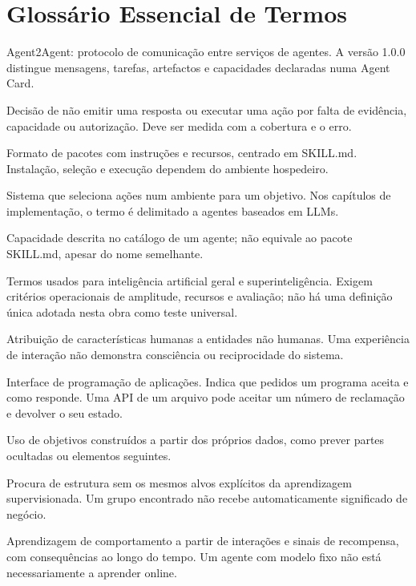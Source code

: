 \chapter{Glossário Essencial de Termos}
\label{ap:glossario}

\begin{description}[style=nextline,leftmargin=0pt,labelindent=0pt,labelsep=0pt,labelwidth=0pt]
\item[A2A] Agent2Agent: protocolo de comunicação entre serviços de agentes. A versão 1.0.0 distingue mensagens, tarefas, artefactos e capacidades declaradas numa Agent Card.
\item[Abstinência] Decisão de não emitir uma resposta ou executar uma ação por falta de evidência, capacidade ou autorização. Deve ser medida com a cobertura e o erro.
\item[Agent Skills] Formato de pacotes com instruções e recursos, centrado em SKILL.md. Instalação, seleção e execução dependem do ambiente hospedeiro.
\item[Agente] Sistema que seleciona ações num ambiente para um objetivo. Nos capítulos de implementação, o termo é delimitado a agentes baseados em LLMs.
\item[AgentSkill em A2A] Capacidade descrita no catálogo de um agente; não equivale ao pacote SKILL.md, apesar do nome semelhante.
\item[AGI e ASI] Termos usados para inteligência artificial geral e superinteligência. Exigem critérios operacionais de amplitude, recursos e avaliação; não há uma definição única adotada nesta obra como teste universal.
\item[Antropomorfização] Atribuição de características humanas a entidades não humanas. Uma experiência de interação não demonstra consciência ou reciprocidade do sistema.
\item[API] Interface de programação de aplicações. Indica que pedidos um programa aceita e como responde. Uma API de um arquivo pode aceitar um número de reclamação e devolver o seu estado.
\item[Aprendizagem autossupervisionada] Uso de objetivos construídos a partir dos próprios dados, como prever partes ocultadas ou elementos seguintes.
\item[Aprendizagem não supervisionada] Procura de estrutura sem os mesmos alvos explícitos da aprendizagem supervisionada. Um grupo encontrado não recebe automaticamente significado de negócio.
\item[Aprendizagem por reforço] Aprendizagem de comportamento a partir de interações e sinais de recompensa, com consequências ao longo do tempo. Um agente com modelo fixo não está necessariamente a aprender online.

\end{description}
